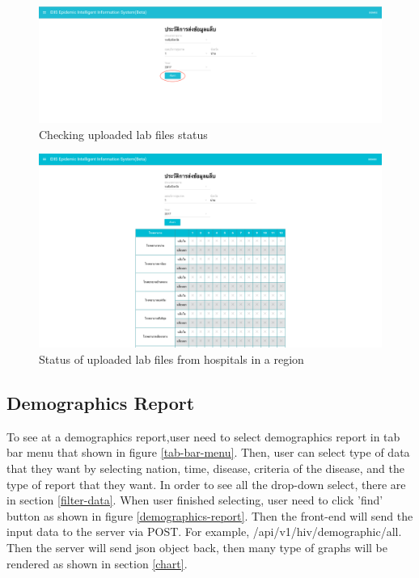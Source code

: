     \FloatBarrier
    	\begin{figure}[h!]
            \centering
        		\includegraphics[width=12cm]{images/chapter-05/check-upload-status0.png}
        		\caption{Checking uploaded lab files status}
        		\label{upload-status0}
        \end{figure}
	\FloatBarrier
	
	\FloatBarrier
    	\begin{figure}[h!]
            \centering
        		\includegraphics[width=12cm]{images/chapter-05/check-upload-status.png}
        		\caption{Status of uploaded lab files from hospitals in a region}
        		\label{upload-status}
        \end{figure}
	\FloatBarrier
	
	
	\subsection{Demographics Report} \label{demographics_report}
	
	To see at a demographics report,user need to select demographics report in tab bar menu that shown in figure \ref{tab-bar-menu}. Then, user can select type of data that they want by selecting nation, time, disease, criteria of the disease, and the type of report that they want. In order to see all the drop-down select, there are in section \ref{filter-data}. When user finished selecting, user need to click 'find' button as shown in figure \ref{demographics-report}. Then the front-end will send the input data to the server via POST. For example, /api/v1/hiv/demographic/all. Then the server will send json object back, then many type of graphs will be rendered as shown in section \ref{chart}.
	
